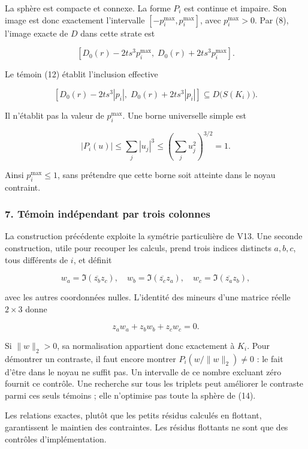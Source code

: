 \documentclass[
  10pt,
  a4paper,
]{article}
\begin{document}
La sphère est compacte et connexe. La forme \(P_i\) est continue et
impaire. Son image est donc exactement l'intervalle
\([-p_i^{\max},p_i^{\max}]\), avec \(p_i^{\max}>0\). Par (8), l'image
exacte de \(D\) dans cette strate est

\[
\boxed{\left[D_0(r)-2ts^3p_i^{\max},\;
D_0(r)+2ts^3p_i^{\max}\right].} \tag{14}
\]

Le témoin (12) établit l'inclusion effective

\[
\left[D_0(r)-2ts^3|p_i|,\;
D_0(r)+2ts^3|p_i|\right]
\subseteq D\bigl(S(K_i)\bigr). \tag{15}
\]

Il n'établit pas la valeur de \(p_i^{\max}\). Une borne universelle
simple est

\[
|P_i(u)|\le\sum_j|u_j|^3\le\left(\sum_j u_j^2\right)^{3/2}=1.
\]

Ainsi \(p_i^{\max}\le1\), sans prétendre que cette borne soit atteinte
dans le noyau contraint.

\hypertarget{tuxe9moin-induxe9pendant-par-trois-colonnes}{%
\subsubsection{7. Témoin indépendant par trois
colonnes}\label{tuxe9moin-induxe9pendant-par-trois-colonnes}}

La construction précédente exploite la symétrie particulière de V13. Une
seconde construction, utile pour recouper les calculs, prend trois
indices distincts \(a,b,c\), tous différents de \(i\), et définit

\[
w_a=\Im(\overline{z_b}z_c),\quad
w_b=\Im(\overline{z_c}z_a),\quad
w_c=\Im(\overline{z_a}z_b),
\]

avec les autres coordonnées nulles. L'identité des mineurs d'une matrice
réelle \(2\times3\) donne

\[
z_aw_a+z_bw_b+z_cw_c=0.
\]

Si \(\|w\|_2>0\), sa normalisation appartient donc exactement à \(K_i\).
Pour démontrer un contraste, il faut encore montrer
\(P_i(w/\|w\|_2)\ne0\) : le fait d'être dans le noyau ne suffit pas. Un
intervalle de ce nombre excluant zéro fournit ce contrôle. Une recherche
sur tous les triplets peut améliorer le contraste parmi ces seuls
témoins ; elle n'optimise pas toute la sphère de (14).

Les relations exactes, plutôt que les petits résidus calculés en
flottant, garantissent le maintien des contraintes. Les résidus
flottants ne sont que des contrôles d'implémentation.
\end{document}
